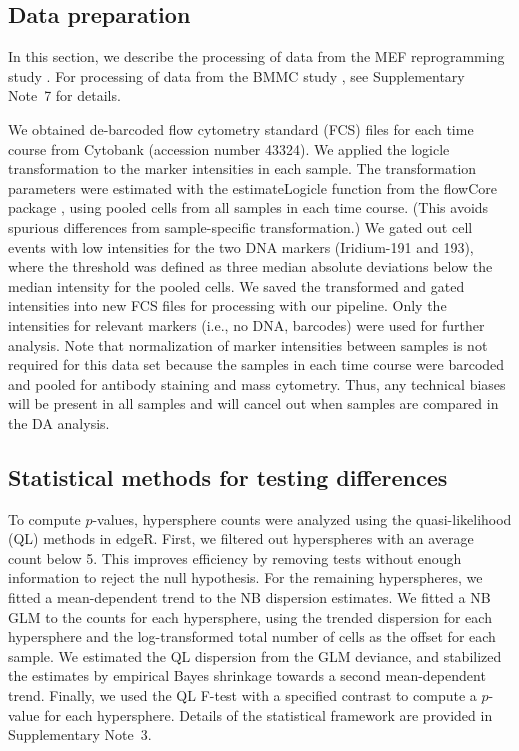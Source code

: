 \documentclass{article}
\newcommand{\suppsecedgeR}{3}
\newcommand{\suppsecbmmc}{7}
\begin{document}
\subsection{Data preparation}
In this section, we describe the processing of data from the MEF reprogramming study \cite{zunder2015continuous}.
For processing of data from the BMMC study \cite{levine2015datadriven}, see Supplementary Note~\suppsecbmmc{} for details.

We obtained de-barcoded flow cytometry standard (FCS) files for each time course from Cytobank (accession number 43324).
We applied the logicle transformation \cite{parks2006new} to the marker intensities in each sample.
The transformation parameters were estimated with the estimateLogicle function from the flowCore package \cite{hahne2009flowcore}, using pooled cells from all samples in each time course.
(This avoids spurious differences from sample-specific transformation.)
We gated out cell events with low intensities for the two DNA markers (Iridium-191 and 193), where the threshold was defined as three median absolute deviations below the median intensity for the pooled cells.
We saved the transformed and gated intensities into new FCS files for processing with our pipeline.
Only the intensities for relevant markers (i.e., no DNA, barcodes) were used for further analysis.
Note that normalization of marker intensities between samples is not required for this data set because the samples in each time course were barcoded and pooled for antibody staining and mass cytometry.
Thus, any technical biases will be present in all samples and will cancel out when samples are compared in the DA analysis.

\subsection{Statistical methods for testing differences}
To compute $p$-values, hypersphere counts were analyzed using the quasi-likelihood (QL) methods in edgeR.
First, we filtered out hyperspheres with an average count below 5.
This improves efficiency by removing tests without enough information to reject the null hypothesis.
For the remaining hyperspheres, we fitted a mean-dependent trend to the NB dispersion estimates.
We fitted a NB GLM to the counts for each hypersphere, using the trended dispersion for each hypersphere and the log-transformed total number of cells as the offset for each sample.
We estimated the QL dispersion from the GLM deviance, and stabilized the estimates by empirical Bayes shrinkage towards a second mean-dependent trend.
Finally, we used the QL F-test with a specified contrast to compute a $p$-value for each hypersphere.
Details of the statistical framework are provided in Supplementary Note~\suppsecedgeR{}.
\end{document}
